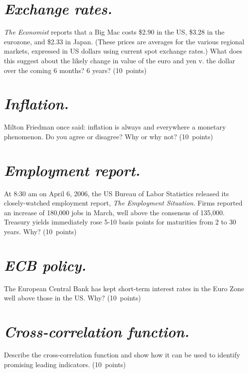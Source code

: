 \documentclass[letterpaper,12pt]{exam}
\begin{document}
\begin{questions}


\begin{parts}
\part {\it Exchange rates.\/}
{\it The Economist\/} reports that a Big Mac costs \$2.90 in the US, \$3.28 in the eurozone,
and \$2.33 in Japan.  (These prices are averages for the various regional markets, expressed in US
dollars using current spot exchange rates.)  What does this suggest about the likely change in
value of the euro and yen v. the dollar over the coming 6 months?  6 years? (10~points)

\part {\it Inflation.\/}
Milton Friedman once said:  inflation is always and everywhere a monetary phenomenon.
Do you agree or disagree?  Why or why not?  (10~points)

\part {\it Employment report.\/}
At 8:30 am on April 6, 2006,
the US Bureau of Labor Statistics released
its closely-watched employment report, {\it The Employment Situation\/}.
Firms reported an increase of 180,000 jobs in March,
well above the consensus of 135,000.
Treasury yields immediately rose 5-10 basis points
for maturities from 2 to 30 years.
Why?
(10~points)

\part {\it ECB policy.\/}
The European Central Bank has kept short-term interest rates
in the Euro Zone well above those in the US.
Why?  (10~points)

\part {\it Cross-correlation function.\/}
Describe the cross-correlation function and show how it can
be used to identify promising leading indicators.
(10~points)
\end{parts}

\begin{solution}
\begin{parts}


\end{parts}
\end{solution}
\end{questions}
\end{document}
